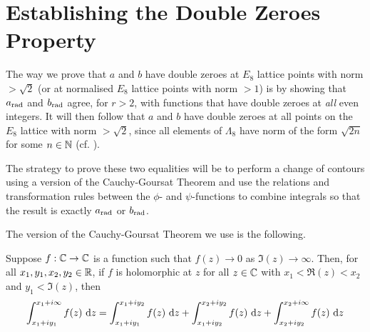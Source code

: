 \section{Establishing the Double Zeroes Property}


The way we prove that $a$ and $b$ have double zeroes at $E_8$ lattice points with norm $> \sqrt{2}$ (or at normalised $E_8$ lattice points with norm $> 1$) is by showing that $a_{\operatorname{rad}}$ and $b_{\operatorname{rad}}$ agree, for $r > 2$, with functions that have double zeroes at \textit{all} even integers. It will then follow that $a$ and $b$ have double zeroes at all points on the $E_8$ lattice with norm $> \sqrt{2}$, since all elements of $\Lambda_8$ have norm of the form $\sqrt{2n}$ for some $n \in \mathbb{N}$ (cf. \sorry).

The strategy to prove these two equalities will be to perform a change of contours using a version of the Cauchy-Goursat Theorem and use the relations and transformation rules between the $\phi$- and $\psi$-functions to combine integrals so that the result is exactly $a_{\operatorname{rad}}$ or $b_{\operatorname{rad}}$.

The version of the Cauchy-Goursat Theorem we use is the following.

\begin{boxtheorem}\label{Ch4:Thm:CauchyGoursat_Unbounded}
    Suppose $f : \mathbb{C} \to \mathbb{C}$ is a function such that $f(z) \to 0$ as $\Im(z) \to \infty$. Then, for all $x_1, y_1, x_2, y_2 \in \mathbb{R}$, if $f$ is holomorphic at $z$ for all $z \in \mathbb{C}$ with $x_1 < \Re(z) < x_2$ and $y_1 < \Im(z)$, then
    \begin{align*}
        \int_{x_1 + iy_1}^{x_1 + i\infty} f(z) \, \operatorname{d}\!{z}
        = \int_{x_1 + iy_1}^{x_1 + iy_2} f(z) \, \operatorname{d}\!{z}
        + \int_{x_1 + iy_2}^{x_2 + iy_2} f(z) \, \operatorname{d}\!{z}
        + \int_{x_2 + iy_2}^{x_2 + i\infty} f(z) \, \operatorname{d}\!{z}
    \end{align*}
\end{boxtheorem}

